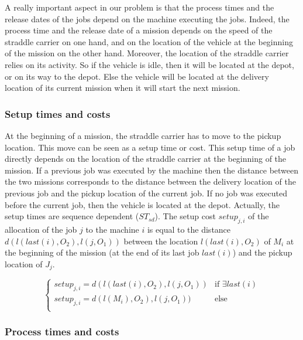 \documentclass[a4paper,10pt]{article}
\begin{document}
A really important aspect in our problem is that the process times and the release dates of the jobs depend on the machine executing the jobs. Indeed, the process time and the release date of a mission depends on the speed of the straddle carrier on one hand, and on the location of the vehicle at the beginning of the mission on the other hand. Moreover, the location of the straddle carrier relies on its activity. So if the vehicle is idle, then it will be located at the depot, or on its way to the depot. Else the vehicle will be located at the delivery location of its current mission when it will start the next mission.

\subsubsection{Setup times and costs}

At the beginning of a mission, the straddle carrier has to move to the pickup location. This move can be seen as a setup time or cost. This setup time of a job directly depends on the location of the straddle carrier at the beginning of the mission. If a previous job was executed by the machine then the distance between the two missions corresponds to the distance between the delivery location of the previous job and the pickup location of the current job. If no job was executed before the current job, then the vehicle is located at the depot. Actually, the setup times are sequence dependent ($ST_{sd}$).
The setup cost $setup_{j, i}$ of the allocation of the job $j$ to the machine $i$ is equal to the distance $d(l(last(i),O_2),l(j,O_1))$ between the location $l(last(i),O_2)$ of $M_i$ at the beginning of the mission (at the end of its last job $last(i)$) and the pickup location of $J_j$.

\begin{equation*}
 \begin{cases}
  setup_{j, i} = d(l(last(i),O_2),l(j,O_1)) & \text{if $\exists last(i)$}\\
  setup_{j, i} = d(l(M_i),O_2),l(j,O_1)) & \text{else}\\
 \end{cases}
\end{equation*}

\subsubsection{Process times and costs}
\end{document}
